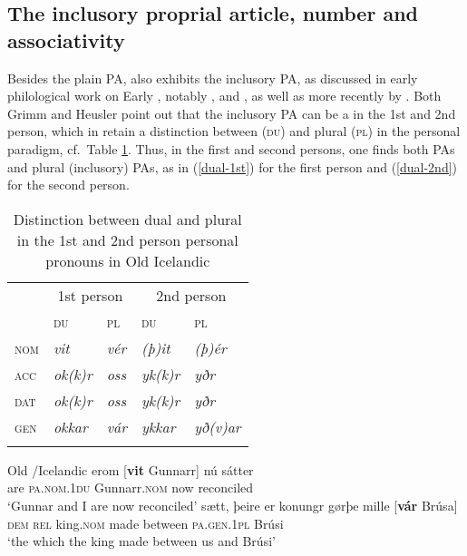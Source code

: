 \documentclass[output=paper,colorlinks,citecolor=brown]{langscibook}
\begin{document}
\subsection{The inclusory proprial article, number and associativity}

Besides the plain PA,  also exhibits the inclusory PA, as discussed in early philological work on Early , notably \citet[220]{bergmann1838poemes}, \citet[350--351]{grimm1898deutsche} and \citet[§395--396, §404--405]{heusler1962altislandisches}, as well as more recently by \citet[90]{Faarlund04}. Both Grimm and Heusler point out that the inclusory PA can be a   in the 1st and 2nd person, which in  retain a distinction between  (\textsc{du}) and plural (\textsc{pl}) in the personal  paradigm, cf.~Table \ref{tab:du-pl}. Thus, in the first and second persons, one finds both  PAs and plural (inclusory) PAs, as in (\ref{dual-1st}) for the first person and (\ref{dual-2nd}) for the second person.

\begin{table}
    \caption{Distinction between dual and plural in the 1st and 2nd person personal pronouns in Old Icelandic \citep[61]{Barnes08} }
    \label{tab:du-pl}
 \begin{tabular}{l llll}
  \lsptoprule
  & \multicolumn{2}{c}{1st person} & \multicolumn{2}{c}{2nd person}\\\cmidrule(lr){2-3}\cmidrule(lr){4-5}
  &  \textsc{du} &  \textsc{pl}   &  \textsc{du} &  \textsc{pl}\\
  \midrule
    \textsc{nom} & \textit{vit} & \textit{vér} & \textit{(þ)it} & \textit{(þ)ér}\\
    \textsc{acc} & \textit{ok(k)r} & \textit{oss} & \textit{yk(k)r} & \textit{yðr}\\
    \textsc{dat} & \textit{ok(k)r} & \textit{oss} & \textit{yk(k)r} & \textit{yðr}\\
    \textsc{gen} & \textit{okkar} & \textit{vár} & \textit{ykkar} & \textit{yð(v)ar}\\
  \lspbottomrule
 \end{tabular}
\end{table}


\ea \label{dual-1st} Old /Icelandic
\ea \gll erom [\textbf{vit} Gunnarr] nú sátter\\
are \textsc{pa.nom.1du} Gunnarr.\textsc{nom} now  reconciled\\
\glt `Gunnar and I are now reconciled'
\ex \gll sætt, þeire er konungr gørþe mille [\textbf{vár} Brúsa]\\
 \textsc{dem} \textsc{rel} king.\textsc{nom} made between \textsc{pa.gen.1pl} Brúsi\\
\glt `the  which the king made between us and Brúsi' \\ 
\citep[p.~124, §395]{heusler1962altislandisches}
\z 
\z 
\end{document}
